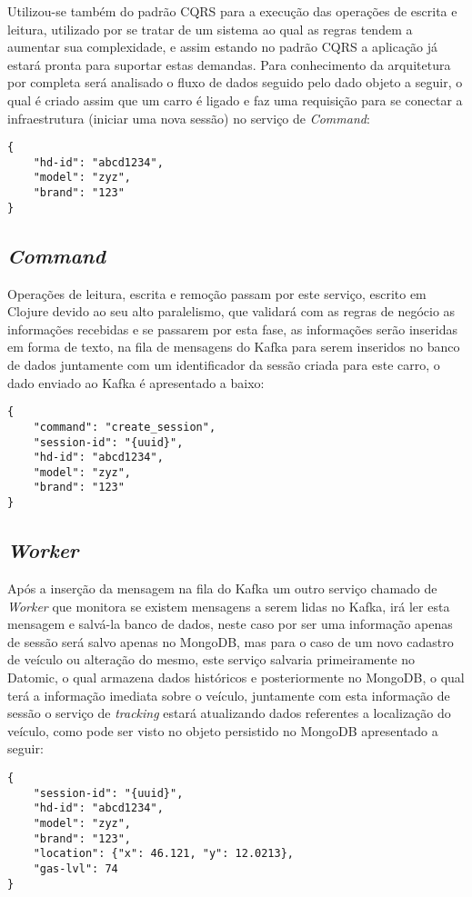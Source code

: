 Utilizou-se também do padrão CQRS para a execução das operações de escrita e leitura, utilizado por se tratar de um sistema ao qual as regras tendem a aumentar sua complexidade, e assim estando no padrão CQRS a aplicação já estará pronta para suportar estas demandas. Para conhecimento da arquitetura por completa será analisado o fluxo de dados seguido pelo dado objeto a seguir, o qual é criado assim que um carro é ligado e faz uma requisição para se conectar a infraestrutura (iniciar uma nova sessão) no serviço de \textit{Command}:
\begin{lstlisting}
{
	"hd-id": "abcd1234",
	"model": "zyz",
	"brand": "123"
}
\end{lstlisting}

\subsection{\textit{Command}}
Operações de leitura, escrita e remoção passam por este serviço, escrito em Clojure devido ao seu alto paralelismo, que validará com as regras de negócio as informações recebidas e se passarem por esta fase, as informações serão inseridas em forma de texto, na fila de mensagens do Kafka para serem inseridos no banco de dados juntamente com um identificador da sessão criada para este carro, o dado enviado ao Kafka é apresentado a baixo:
\begin{lstlisting}
{
	"command": "create_session",
	"session-id": "{uuid}",
	"hd-id": "abcd1234",
	"model": "zyz",
	"brand": "123"
}
\end{lstlisting}

\subsection{\textit{Worker}}
Após a inserção da mensagem na fila do Kafka um outro serviço chamado de \textit{Worker} que monitora se existem mensagens a serem lidas no Kafka, irá ler esta mensagem e salvá-la banco de dados, neste caso por ser uma informação apenas de sessão será salvo apenas no MongoDB, mas para o caso de um novo cadastro de veículo ou alteração do mesmo, este serviço salvaria primeiramente no Datomic, o qual armazena dados históricos e posteriormente no MongoDB, o qual terá a informação imediata sobre o veículo, juntamente com esta informação de sessão o serviço de \textit{tracking} estará atualizando dados referentes a localização do veículo, como pode ser visto no objeto persistido no MongoDB apresentado a seguir: 
\begin{lstlisting}
{
	"session-id": "{uuid}",
	"hd-id": "abcd1234",
	"model": "zyz",
	"brand": "123",
	"location": {"x": 46.121, "y": 12.0213},
	"gas-lvl": 74
}
\end{lstlisting}


